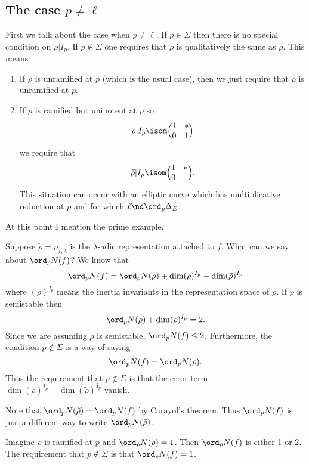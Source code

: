 \documentclass{report}
\begin{document}
\subsection{The case $p\neq\ell$}
First we talk about the case when $p\neq\ell$.
If $p\in\Sigma$ then there is no special condition on $\tilde{\rho}|I_p$.
If $p\not\in\Sigma$ one requires that $\tilde{\rho}$ is qualitatively
the same as $\rho$. This means
\begin{enumerate}
\item If $\rho$ is unramified at $p$ (which is the usual case), then
we just require that $\tilde{\rho}$ is unramified at $p$.
\item If $\rho$ is ramified but unipotent at $p$ so
$$\rho|I_p\isom
    \Bigl(\begin{matrix}1&*\\0&1\end{matrix}\Bigr)$$
we require that
$$\tilde{\rho}|I_p\isom
    \Bigl(\begin{matrix}1&*\\0&1\end{matrix}\Bigr).$$
This situation can occur with an elliptic curve which has multiplicative
reduction at $p$ and for which $\ell\nd\ord_p\Delta_E$.
\end{enumerate}

At this point I mention the prime example.
\begin{example} Suppose
$\tilde{\rho}=\rho_{f,\lambda}$ is the $\lambda$-adic representation
attached to $f$. What can we say about $\ord_p N(f)$? We know that
$$\ord_p N(f)=\ord_p N(\rho) + \dim (\rho)^{I_p} - \dim (\tilde{\rho})^{I_p}$$
where $(\rho)^{I_p}$ means the inertia invariants in the representation
space of $\rho$. If $\rho$ is semistable then
$$\ord_p N(\rho)+\dim (\rho)^{I_p} = 2.$$
Since we are assuming $\rho$ is semistable,
$\ord_p N(f)\leq 2$. Furthermore, the condition
$p\not\in\Sigma$ is a way of saying
$$\ord_p N(f) = \ord_p N(\rho). $$
Thus the requirement that $p\not\in\Sigma$ is that the
error term $\dim(\rho)^{I_p}-\dim(\tilde{\rho})^{I_p}$ vanish.

Note that $\ord_p N(\tilde{\rho})=\ord_p N(f)$ by Carayol's theorem.
Thus $\ord_p N(f)$ is just a different way to write $\ord_p N(\tilde{\rho})$.
\end{example}

\begin{example}
Imagine $\rho$ is ramified at $p$ and $\ord_p N(\rho)=1$.
Then $\ord_p N(f)$ is either 1 or 2. The requirement that $p\not\in\Sigma$
is that $\ord_p N(f)=1$.
\end{example}
\end{document}

